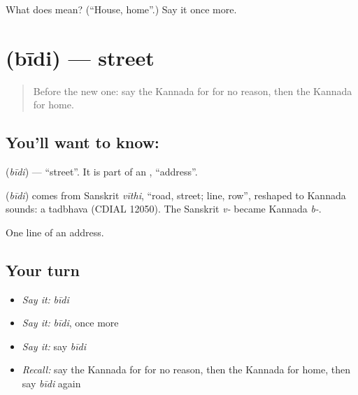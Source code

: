 \begin{tcolorbox}[breakable,colback=teal!4,colframe=teal!35!black,title={Before you move on}]
What does  mean? (\textquotedblleft{}House, home\textquotedblright{}.) Say it once more.
\end{tcolorbox}
\section[\texorpdfstring{\kn{ಬೀದಿ} (bīdi)}{ಬೀದಿ (bīdi)}]{ (bīdi) — street}

\label{lesson:KA-C103-street}



\begin{quote}
Before the new one: say the Kannada for for no reason, then the Kannada for home.
\end{quote}

\subsection*{You'll want to know: }
\textbf{} (\emph{bīdi}) — \textquotedblleft{}street\textquotedblright{}. It is part of an \textbf{}, \textquotedblleft{}address\textquotedblright{}.

\begin{cousinweb}
\textbf{} (\emph{bīdi}) comes from Sanskrit \emph{vīthi}, \textquotedblleft{}road, street; line, row\textquotedblright{}, reshaped to Kannada sounds: a tadbhava (CDIAL 12050). The Sanskrit \emph{v-} became Kannada \emph{b-}.
\end{cousinweb}

\begin{grammarlens}[title={What you've built}]
One line of an address.
\end{grammarlens}

\subsection*{Your turn}
\begin{itemize}
\raggedright
  \item \emph{Say it:} \emph{bīdi}
  \item \emph{Say it:} \emph{bīdi}, once more
  \item \emph{Say it:} say \emph{bīdi}
  \item \emph{Recall:} say the Kannada for for no reason, then the Kannada for home, then say \emph{bīdi} again
\end{itemize}

